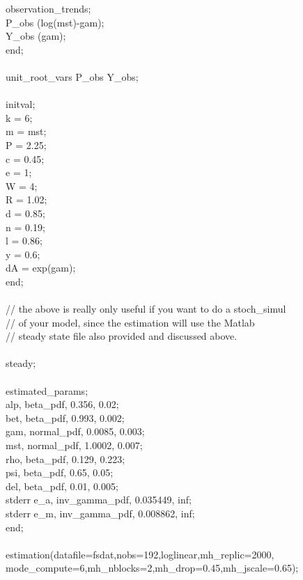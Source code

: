 {observation\_trends;\\
P\_obs (log(mst)-gam);\\
Y\_obs (gam);\\
end;\\
\\
unit\_root\_vars P\_obs Y\_obs;\\
\\
initval;\\
k = 6;\\
m = mst;\\
P = 2.25;\\
c = 0.45;\\
e = 1;\\
W = 4;\\
R = 1.02;\\
d = 0.85;\\
n = 0.19;\\
l = 0.86;\\
y = 0.6;\\
dA = exp(gam);\\
end;\\
\\
// the above is really only useful if you want to do a stoch\_simul\\
// of your model, since the estimation will use the Matlab\\
// steady state file also provided and discussed above.\\
\\
steady;\\
\\
estimated\_params;\\
alp, beta\_pdf, 0.356, 0.02; \\ 
bet, beta\_pdf, 0.993, 0.002; \\
gam, normal\_pdf, 0.0085, 0.003; \\
mst, normal\_pdf, 1.0002, 0.007; \\
rho, beta\_pdf, 0.129, 0.223;\\
psi, beta\_pdf, 0.65, 0.05;\\
del, beta\_pdf, 0.01, 0.005;\\
stderr e\_a, inv\_gamma\_pdf, 0.035449, inf;\\
stderr e\_m, inv\_gamma\_pdf, 0.008862, inf;\\
end;\\
\\
estimation(datafile=fsdat,nobs=192,loglinear,mh\_replic=2000,\\
mode\_compute=6,mh\_nblocks=2,mh\_drop=0.45,mh\_jscale=0.65);}\\
\\

